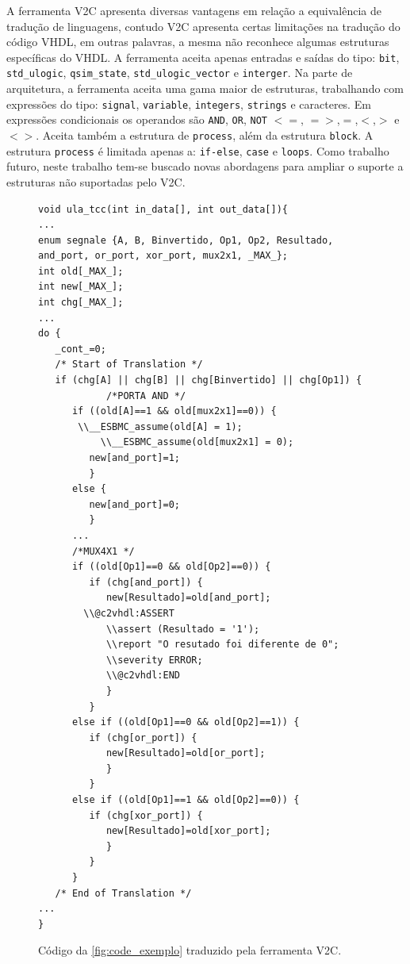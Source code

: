 \par
A ferramenta V2C apresenta diversas vantagens em relação a equivalência de tradução de linguagens, contudo V2C apresenta certas limitações na tradução do código VHDL, em outras palavras, a mesma não reconhece algumas estruturas específicas do VHDL. A ferramenta aceita apenas entradas e saídas do tipo: \texttt{bit}, \texttt{std\_ulogic}, \texttt{qsim\_state}, \texttt{std\_ulogic\_vector} e \texttt{interger}. Na parte de arquitetura, a ferramenta aceita uma gama maior de estruturas, trabalhando com expressões do tipo: \texttt{signal}, \texttt{variable}, \texttt{integers}, \texttt{strings} e caracteres. Em expressões condicionais os operandos são \texttt{AND}, \texttt{OR}, \texttt{NOT} $<=$, $=>$,$=$,$<$,$>$ e $<>$. Aceita também a estrutura de \texttt{process}, além da estrutura \texttt{block}. A estrutura \texttt{process} é limitada apenas a: \texttt{if-else}, \texttt{case} e \texttt{loops}. Como trabalho futuro, neste trabalho tem-se buscado novas abordagens para ampliar o suporte a estruturas não suportadas pelo V2C.

\begin{figure}[H]
\caption{\label{fig:code_traduzido} Código da \autoref{fig:code_exemplo} traduzido pela ferramenta V2C.}
	\begin{center}
    \begin{minipage}{0.99\textwidth}
    \begin{lstlisting}      
void ula_tcc(int in_data[], int out_data[]){
...
enum segnale {A, B, Binvertido, Op1, Op2, Resultado, and_port, or_port, xor_port, mux2x1, _MAX_};
int old[_MAX_];
int new[_MAX_];
int chg[_MAX_];
...
do {
   _cont_=0;
   /* Start of Translation */
   if (chg[A] || chg[B] || chg[Binvertido] || chg[Op1]) {
            /*PORTA AND */
      if ((old[A]==1 && old[mux2x1]==0)) {
	   \\__ESBMC_assume(old[A] = 1);
           \\__ESBMC_assume(old[mux2x1] = 0);
         new[and_port]=1;
         }
      else {
         new[and_port]=0;
         }
      ...
      /*MUX4X1 */
      if ((old[Op1]==0 && old[Op2]==0)) {
         if (chg[and_port]) {
            new[Resultado]=old[and_port];
	    \\@c2vhdl:ASSERT
            \\assert (Resultado = '1');
            \\report "O resutado foi diferente de 0";
            \\severity ERROR;
            \\@c2vhdl:END
            }
         }
      else if ((old[Op1]==0 && old[Op2]==1)) {
         if (chg[or_port]) {
            new[Resultado]=old[or_port];
            }
         }
      else if ((old[Op1]==1 && old[Op2]==0)) {
         if (chg[xor_port]) {
            new[Resultado]=old[xor_port];
            }
         }
      }
   /* End of Translation */
...
}
    \end{lstlisting}
    \end{minipage}
	\end{center}
\end{figure}

